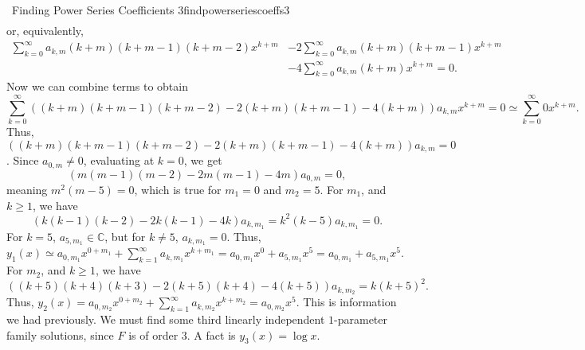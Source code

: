 \begin{example}{\Difficulty\,\Difficulty\,\,Finding Power Series Coefficients 3}{findpowerseriescoeffs3}
\begin{align*}
            \end{align*}
            or, equivalently,
            \begin{align*}
                \sum_{k=0}^\infty a_{k,m}(k+m)(k+m-1)(k+m-2)x^{k+m}&-2\sum_{k=0}^\infty a_{k,m}(k+m)(k+m-1)x^{k+m}\\
                &-4\sum_{k=0}^\infty a_{k,m}(k+m)x^{k+m}=0.
            \end{align*}
            Now we can combine terms to obtain
            \begin{equation*}
                \sum_{k=0}^\infty ((k+m)(k+m-1)(k+m-2)-2(k+m)(k+m-1)-4(k+m))a_{k,m}x^{k+m}=0\simeq \sum_{k=0}^\infty 0x^{k+m}.
            \end{equation*}
            Thus, \(((k+m)(k+m-1)(k+m-2)-2(k+m)(k+m-1)-4(k+m))a_{k,m}=0\). Since \(a_{0,m}\neq0\), evaluating at \(k=0\), we get
            \begin{equation*}
                (m(m-1)(m-2)-2m(m-1)-4m)a_{0,m}=0,
            \end{equation*}
            meaning \(m^2(m-5)=0\), which is true for \(m_1=0\) and \(m_2=5\). For \(m_1\), and \(k\geq 1\), we have
            \begin{equation*}
                (k(k-1)(k-2)-2k(k-1)-4k)a_{k,m_1}=k^2(k-5)a_{k,m_1}=0.
            \end{equation*}
            For \(k=5\), \(a_{5,m_1}\in\mathbb{C}\), but for \(k\neq5\), \(a_{k,m_1}=0\). Thus, \(y_1(x)\simeq a_{0,m_1}x^{0+m_1}+\sum_{k=1}^\infty a_{k,m_1}x^{k+m_1}=a_{0,m_1}x^0+a_{5,m_1}x^5=a_{0,m_1}+a_{5,m_1}x^5\). For \(m_2\), and \(k\geq 1\), we have
            \begin{equation*}
                ((k+5)(k+4)(k+3)-2(k+5)(k+4)-4(k+5))a_{k,m_2}=k(k+5)^2.
            \end{equation*}
            Thus, \(y_2(x)=a_{0,m_2}x^{0+m_2}+\sum_{k=1}^\infty a_{k,m_2}x^{k+m_2}=a_{0,m_2}x^5\). This is information we had previously. We must find some third linearly independent \(1\)-parameter family solutions, since \(F\) is of order \(3\). A fact is \(y_3(x)=\log x\).
        \end{example}